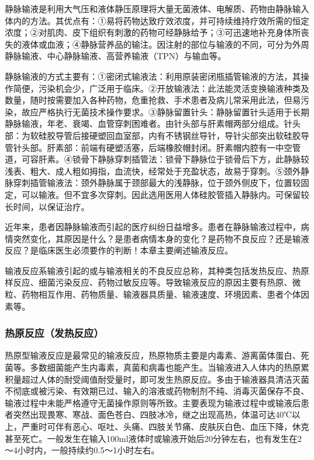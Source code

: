 静脉输液是利用大气压和液体静压原理将大量无菌液体、电解质、药物由静脉输入体内的方法。其优点有：①易将药物达致疗效浓度，并可持续维持疗效所需的恒定浓度；②对肌肉、皮下组织有刺激的药物可经静脉给予；③可迅速地补充身体所丧失的液体或血液；④静脉营养品的输注。因注射的部位与输液的不同，可分为外周静脉输液、中心静脉输液、高营养输液（TPN）与输血等。

静脉输液的方式主要有：①密闭式输液法：利用原装密闭瓶插管输液的方法，其操作简便，污染机会少，广泛用于临床。②开放输液法：此法能灵活变换输液种类及数量，随时按需要加入各种药物，危重抢救、手术患者及病儿常采用此法，但易污染，故应严格执行无菌技术操作要求。③静脉留置针头：静脉留置针头适用于长期静脉输液，年老、衰竭、血管穿刺困难者。由针头部与肝素帽两部分组成。针头部：为软硅胶导管后接硬塑回血室部，内有不锈钢丝导针，导针尖部突出软硅胶导管针头部。肝素部：前端有硬塑活塞，后端橡胶帽封闭。肝素帽内腔有一中空管道，可容肝素。④锁骨下静脉穿刺插管法：锁骨下静脉位于锁骨后下方，此静脉较浅表、粗大、成人粗如拇指，血流快，经常处于充盈状态，故易于穿刺。⑤颈外静脉穿刺插管输液法：颈外静脉属于颈部最大的浅静脉，位于颈外侧皮下，位置较固定，可以输液。但不宜多次穿刺。因此选用医用人体硅胶管插入静脉内。可保留较长时间，以保证治疗。

近年来，患者因静脉输液而引起的医疗纠纷日益增多。患者在静脉输液过程中，病情突然变化，其原因是什么？是患者病情本身的变化？是药物不良反应？还是输液反应？是临床医生必须要作的判断！本章主要阐述输液反应。

输液反应系输液引起的或与输液相关的不良反应总称，其种类包括发热反应、热原样反应、细菌污染反应、药物过敏反应等。导致输液反应的原因主要有热原、微粒、药物相互作用、药物质量、输液器具质量、输液速度、环境因素、患者个体因素等。

\subsubsection{热原反应（发热反应）}

热原型输液反应是最常见的输液反应，热原物质主要是内毒素、游离菌体蛋白、死菌等。多数细菌能产生内毒素，真菌和病毒也能产生。当输液进入人体内的热原累积量超过人体的耐受阈值耐受量时，即可发生热原反应。多由于输液器具清洁灭菌不彻底或被污染、有效期已过、输入的溶液或药物制剂不纯、消毒灭菌保存不良、输液过程中未能严格遵守无菌操作原则等所致。主要表现为输液过程中或输液后患者突然出现畏寒、寒战、面色苍白、四肢冰冷，继之出现高热，体温可达40℃以上，严重时可伴有恶心、呕吐、头痛、四肢关节痛、皮肤灰白色、血压下降，休克甚至死亡。一般发生在输入100ml液体时或输液开始后20分钟左右，也有发生在2～4小时内，一般持续约0.5～1小时左右。

